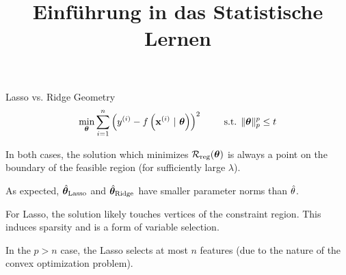 



\newcommand{\titlefigure}{figure_man/l1_l2_hat.png}
\newcommand{\learninggoals}{
  \item Know the geometry of Ridge vs. Lasso regularization
  \item Understand the effects of the methods on model coefficients
  \item Understand that Lasso creates sparse solutions
}

\title{Einführung in das Statistische Lernen}
\date{}




\begin{vbframe}{Lasso vs. Ridge Geometry}
$$
  \min_{\bm{\theta}} \sum\limits_{i=1}^n \left(y^{(i)} - f\left(\mathbf{x}^{(i)} ~|~ \bm{\theta}\right)\right)^2 \qquad \text{ s.t. } \|\bm{\theta}\|_p^p  \leq t
$$
  \vspace{-0.5cm}
  \begin{figure}
    \centering
  \end{figure}

  \begin{itemize}
    \item \small{In both cases, the solution which minimizes $\mathcal{R}_{\text{reg}}(\bm{\theta})$ is always a point on the boundary of the feasible region (for sufficiently large $\lambda$).
    \item As expected, $\hat{\bm{\theta}}_{\text{Lasso}}$ and $\hat{\bm{\theta}}_{\text{Ridge}}$ have smaller parameter norms than $\hat{\theta}$.}
    \item For Lasso, the solution likely touches vertices of the constraint region. This induces sparsity and is a form of variable selection.
    \item In the $p>n$ case, the Lasso selects at most $n$ features (due to the nature of the convex optimization problem).

  \end{itemize}

\end{vbframe}

